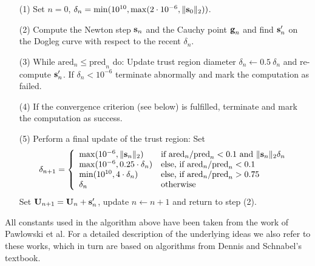 \begin{itemize}
	\item[(1)]
		Set $n=0$, $\delta_n = \min(10^{10}, \max(2 \cdot 10^{-6}, \| \textbf{s}_0 \|_2 ))$.

	\item[(2)]
		Compute the Newton step $\textbf{s}_n$ and the Cauchy point  $\textbf{g}_n$ and
		find $\textbf{s}'_n$ on the Dogleg curve with respect to the recent $\delta_n$.

	\item[(3)]
		While $\textrm{ared}_n \leq \textrm{pred}_n$ do:
		Update trust region diameter $\delta_n \leftarrow 0.5 \ \delta_n$
		and re-compute $\textbf{s}'_n$.
		If $\delta_n < 10^{-6}$ terminate abnormally and mark the computation as failed.

	\item[(4)]
		If the convergence criterion (see below) is fulfilled, terminate and mark the computation as success.

	\item[(5)]
		Perform a final update of the trust region: Set
		\[
			\delta_{n+1} = \left\{ \begin{array}{ll}
				\max( 10^{-6}, \| \textbf{s}_n \|_2 ) & \text{if } \textrm{ared}_n / \textrm{pred}_n < 0.1 \text{ and } \| \textbf{s}_n \|_2 \delta_n \\
				\max( 10^{-6}, 0.25 \cdot \delta_n )    & \text{else, if } \textrm{ared}_n / \textrm{pred}_n < 0.1                                        \\
				\min( 10^{10}, 4 \cdot \delta_n )       & \text{else, if } \textrm{ared}_n / \textrm{pred}_n > 0.75                                       \\
				\delta_{n}                              & \text{otherwise}                                                                                \\
			\end{array} \right.
		\]
		Set $\textbf{U}_{n+1} = \textbf{U}_{n} + \textbf{s}'_{n} $, update $n \leftarrow n + 1$ and return to step (2).

\end{itemize}
All constants used in the algorithm above have been taken from the work of Pawlowski et al. \cite{pawlowskiGlobalizationTechniquesNewton2006}
For a detailed description of the underlying ideas we also refer to these works,
which in turn are based on algorithms from Dennis and Schnabel's textbook. \cite{dennisNumericalMethodsUnconstrained1996}


